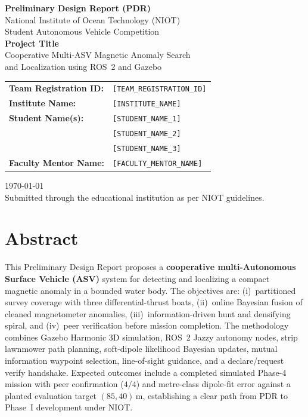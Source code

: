 \documentclass[11pt,a4paper]{article}
\begin{document}
\begin{titlepage}
\centering
\vspace*{1.2cm}

{\LARGE\bfseries Preliminary Design Report (PDR)}\\[0.8cm]
{\large National Institute of Ocean Technology (NIOT)\\
Student Autonomous Vehicle Competition}\\[1.2cm]

{\LARGE\bfseries Project Title}\\[0.35cm]
{\Large Cooperative Multi-ASV Magnetic Anomaly Search\\
and Localization using ROS~2 and Gazebo}\\[1.2cm]

\begin{tabular}{@{}ll@{}}
\textbf{Team Registration ID:} & \texttt{[TEAM\_REGISTRATION\_ID]} \\[0.35cm]
\textbf{Institute Name:} & \texttt{[INSTITUTE\_NAME]} \\[0.35cm]
\textbf{Student Name(s):} & \texttt{[STUDENT\_NAME\_1]} \\
 & \texttt{[STUDENT\_NAME\_2]} \\
 & \texttt{[STUDENT\_NAME\_3]} \\[0.35cm]
\textbf{Faculty Mentor Name:} & \texttt{[FACULTY\_MENTOR\_NAME]} \\
\end{tabular}

\vfill
{\large \today}\\[0.5cm]
{\small Submitted through the educational institution as per NIOT guidelines.}
\end{titlepage}

\section*{Abstract}
This Preliminary Design Report proposes a \textbf{cooperative multi-Autonomous
Surface Vehicle (ASV)} system for detecting and localizing a compact magnetic
anomaly in a bounded water body. The objectives are: (i)~partitioned survey
coverage with three differential-thrust boats, (ii)~online Bayesian fusion of
cleaned magnetometer anomalies, (iii)~information-driven hunt and densifying
spiral, and (iv)~peer verification before mission completion. The methodology
combines Gazebo Harmonic 3D simulation, ROS~2 Jazzy autonomy nodes, strip
lawnmower path planning, soft-dipole likelihood Bayesian updates, mutual
information waypoint selection, line-of-sight guidance, and a declare/request
verify handshake. Expected outcomes include a completed simulated Phase-4
mission with peer confirmation ($4/4$) and metre-class dipole-fit error against
a planted evaluation target $(85,40)\,\mathrm{m}$, establishing a clear path
from PDR to Phase~I development under NIOT.
\end{document}
